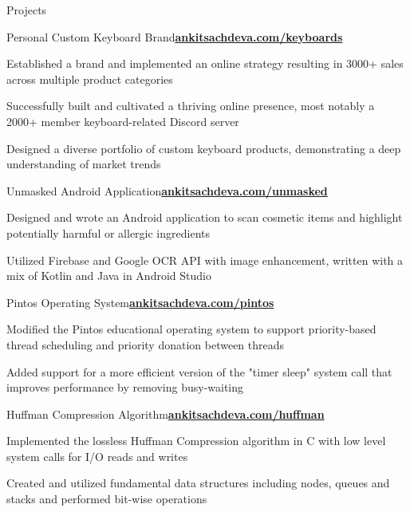 \documentclass{resume}
\begin{document}
\begin{rSection}{\large Projects}

\begin{rSubsection}{Personal Custom Keyboard Brand}{\href{https://ankitsachdeva.com/keyboards}{\bf{{ankitsachdeva.com/keyboards}}}}{}{}
\item Established a brand and implemented an online strategy resulting in 3000+ sales across multiple product categories
\item Successfully built and cultivated a thriving online presence, most notably a 2000+ member keyboard-related Discord server
\item Designed a diverse portfolio of custom keyboard products, demonstrating a deep understanding of market trends
\end{rSubsection}

\begin{rSubsection}{Unmasked Android Application}{\href{https://ankitsachdeva.com/unmasked}{\bf{{ankitsachdeva.com/unmasked}}}}{}{}
\item Designed and wrote an Android application to scan cosmetic items and highlight potentially harmful or allergic ingredients
\item Utilized Firebase and Google OCR API with image enhancement, written with a mix of Kotlin and Java in Android Studio
\end{rSubsection}

\begin{rSubsection}{Pintos Operating System}{\href{http://ankitsachdeva.com/pintos/}{\bf{{ankitsachdeva.com/pintos}}}}{}{}
\item Modified the Pintos educational operating system to support priority-based thread scheduling and priority donation between threads
\item Added support for a more efficient version of the "timer sleep" system call that improves performance by removing busy-waiting
\end{rSubsection}

\begin{rSubsection}{Huffman Compression Algorithm}{\href{https://ankitsachdeva.com/huffman/}{\bf{{ankitsachdeva.com/huffman}}}}{}{}
\item Implemented the lossless Huffman Compression algorithm in C with low level system calls for I/O reads and writes
\item Created and utilized fundamental data structures including nodes, queues and stacks and performed bit-wise operations
\end{rSubsection}


\end{rSection}
\end{document}
